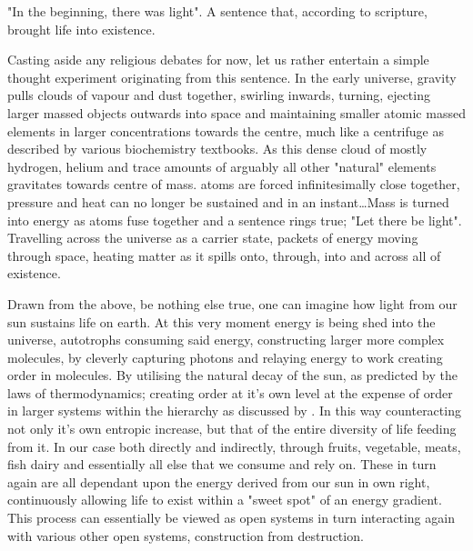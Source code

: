 "In the beginning, there was light". A sentence that, according to scripture, brought life into existence.

Casting aside any religious debates for now, let us rather entertain a simple thought experiment originating from this sentence. In the early universe, gravity pulls clouds of vapour and dust together, swirling inwards, turning, ejecting larger massed objects outwards into space and maintaining smaller atomic massed elements in larger concentrations towards the centre, much like a centrifuge as described by various biochemistry textbooks. As this dense cloud of mostly hydrogen, helium and trace amounts of arguably all other "natural" elements gravitates towards centre of mass. atoms are forced infinitesimally close together,  pressure and heat can no longer be sustained and in an instant\ldots Mass is turned into energy as atoms fuse together and a sentence rings true; "Let there be light". Travelling across the universe as a carrier state, packets of energy moving through space, heating matter as it spills onto, through, into and across all of existence.  

Drawn from the above, be nothing else true, one can imagine how light from our sun sustains life on earth. At this very moment energy is being shed into the universe, \gls{autotrophs} consuming said energy, constructing larger more complex molecules, by cleverly capturing photons and relaying energy to work creating order in molecules. By utilising the natural decay of the sun, as predicted by the laws of thermodynamics; creating order at it's own level at the expense of order in larger systems within the hierarchy as discussed by \citeauthor{Bertalanffy1972}. In this way counteracting not only it's own entropic increase, but that of the entire diversity of life feeding from it. In our case both directly and indirectly, through fruits, vegetable, meats, fish dairy and essentially all else that we consume and rely on. These in turn again are all dependant upon the energy derived from our sun in own right, continuously allowing life to exist within a "sweet spot" of an energy gradient. This process can essentially be viewed as open systems in turn interacting again with various other open systems, construction from destruction. 

